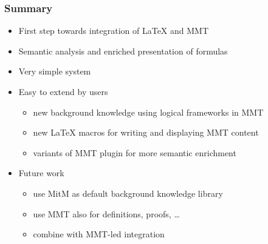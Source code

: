 \begin{frame}\frametitle{Summary}
\begin{itemize}
 \item First step towards integration of LaTeX and MMT
 \item Semantic analysis and enriched presentation of formulas
 \item Very simple system
 \item Easy to extend by users
  \begin{itemize}
  \item new background knowledge using logical frameworks in MMT
  \item new LaTeX macros for writing and displaying MMT content
  \item variants of MMT plugin for more semantic enrichment
  \end{itemize}
 \item Future work
  \begin{itemize}
  \item use MitM as default background knowledge library
  \item use MMT also for definitions, proofs, \ldots
  \item combine with MMT-led integration
  \end{itemize}
\end{itemize}
\end{frame}